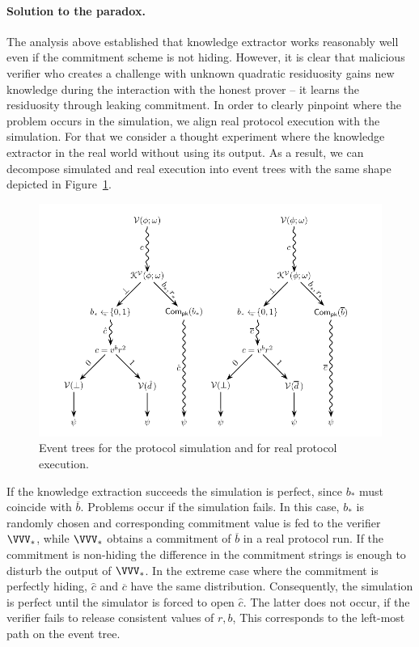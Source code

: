 \documentclass{crypto-exercise}
\begin{document}
\begin{solution}
\paragraph{Solution to the paradox.}
The analysis above established that knowledge extractor works reasonably well even if the commitment scheme is not hiding. However, it is clear that malicious verifier who creates a challenge with unknown quadratic residuosity gains new knowledge during the interaction with the honest prover -- it learns the residuosity through leaking commitment. In order to clearly pinpoint where the problem occurs in the simulation, we align real protocol execution with the simulation. For that we consider a thought experiment where the knowledge extractor in the real world without using its output. As a result, we can decompose simulated and real execution into event trees with the same shape depicted in Figure~\ref{fig:event-trees}.      

\begin{figure}[!h]
   \centering
   \includegraphics[scale=0.85]{figures/1106-event-tree-i}
   \caption{Event trees for the protocol simulation and for real protocol execution.}
   \label{fig:event-trees}
\end{figure}


If the knowledge extraction succeeds the simulation is perfect, since $b_*$ must coincide with $\overline{b}$. Problems occur if the simulation fails. In this case, $b_*$ is randomly chosen and corresponding commitment value is fed to the verifier $\VVV_*$, while $\VVV_*$ obtains a commitment of $\overline{b}$ in a real protocol run. If the commitment is non-hiding the difference in the commitment strings is enough to disturb the output of $\VVV_*$. In the extreme case where the commitment is perfectly hiding,  $\hat{c}$ and  $\overline{c}$ have the same distribution. Consequently, the simulation is perfect until the  simulator is forced to open $\hat{c}$. The latter does not occur, if the verifier fails to release consistent values of $r,b$, This corresponds to the left-most path on the event tree.   


\end{solution}
\end{document}
